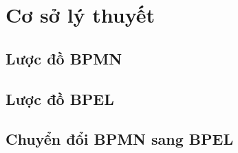 \section{Cơ sở lý thuyết}
    \subsection{Lược đồ BPMN}
    
    \subsection{Lược đồ BPEL}
    
    \subsection{Chuyển đổi BPMN sang BPEL}
